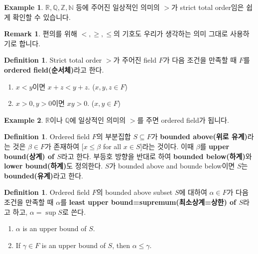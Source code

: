 \documentclass[12pt]{article}
\theoremstyle{definition}
\newtheorem{defn}[thm]{Definition}
\newtheorem*{rem}{Remark}
\newtheorem*{ex}{Example}
\def\NN{\mathbb{N}}
\def\ZZ{\mathbb{Z}}
\def\QQ{\mathbb{Q}}
\def\RR{\mathbb{R}}
\begin{document}
	\begin{ex}
		\(\RR, \QQ, \ZZ, \NN\) 등에 주어진 일상적인 의미의 \(>\)가 strict total order임은 쉽게 확인할 수 있습니다.
	\end{ex}

	\begin{rem}
		편의를 위해 \(<, \ge, \le\)의 기호도 우리가 생각하는 의미 그대로 사용하기로 합니다.
	\end{rem}

	\begin{defn}
		Strict total order \(>\)가 주어진 field \(F\)가 다음 조건을 만족할 때 \(F\)를 \textbf{ordered field(순서체)}라고 한다.
		\begin{enumerate} [label=(\alph*), leftmargin=2\parindent]
			\item
			\(x < y\)이면 \(x + z < y + z\). (\(x, y, z \in F\))
			\item
			\(x > 0, y > 0\)이면 \(xy > 0\). (\(x, y \in F\))
		\end{enumerate}
	\end{defn}

	\begin{ex}
		\(\RR\)이나 \(\QQ\)에 일상적인 의미의 \(>\)를 주면 ordered field가 됩니다.
	\end{ex}

	\begin{defn}
		Ordered field \(F\)의 부분집합 \(S \subseteq F\)가 \textbf{bounded above(위로 유계)}라는 것은 \(\beta \in F\)가 존재하여 [\(x \le \beta\) for all \(x \in S\)]라는 것이다. 이때 \(\beta\)를 \textbf{upper bound(상계) of \(S\)}라고 한다. 부등호 방향을 반대로 하여 \textbf{bounded below(하계)}와 \textbf{lower bound(하계)}도 정의한다. \(S\)가 bounded above and bounde below이면 \(S\)는 \textbf{bounded(유계)}라고 한다.
	\end{defn}
	
	\begin{defn}
		Ordered field \(F\)의 bounded above subset \(S\)에 대하여 \(\alpha \in F\)가 다음 조건을 만족할 때 \(\alpha\)를 \textbf{least upper bound=supremum(최소상계=상한) of \(S\)}라고 하고, \(\alpha = \sup S\)로 쓴다.
		\begin{enumerate} [label=(\alph*), leftmargin=2\parindent]
			\item
			\(\alpha\) is an upper bound of \(S\).
			\item
			If \(\gamma \in F\) is an upper bound of \(S\), then \(\alpha \le \gamma\).
		\end{enumerate}
	\end{defn}
\end{document}
